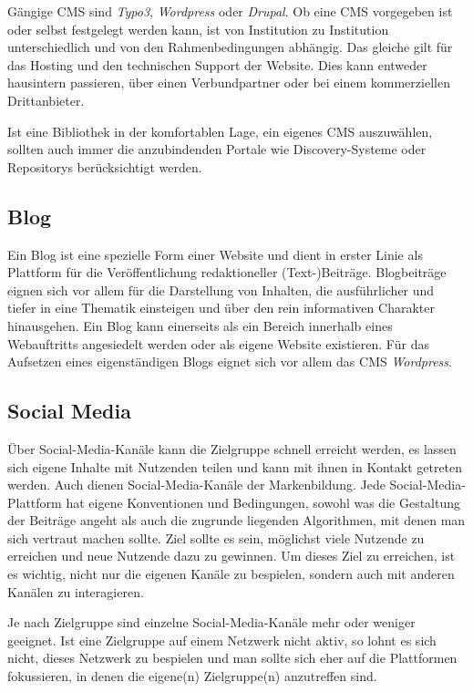 \documentclass[
  11pt,
  letterpaper,
  DIV=11,
  twoside]{scrreprt}
\begin{document}
Gängige CMS sind \emph{Typo3}, \emph{Wordpress} oder \emph{Drupal}. Ob
eine CMS vorgegeben ist oder selbst festgelegt werden kann, ist von
Institution zu Institution unterschiedlich und von den Rahmenbedingungen
abhängig. Das gleiche gilt für das Hosting und den technischen Support
der Website. Dies kann entweder hausintern passieren, über einen
Verbundpartner oder bei einem kommerziellen Drittanbieter.

Ist eine Bibliothek in der komfortablen Lage, ein eigenes CMS
auszuwählen, sollten auch immer die anzubindenden Portale wie
Discovery-Systeme oder Repositorys berücksichtigt werden.

\subsection{Blog}\label{blog}

Ein Blog ist eine spezielle Form einer Website und dient in erster Linie
als Plattform für die Veröffentlichung redaktioneller (Text-)Beiträge.
Blogbeiträge eignen sich vor allem für die Darstellung von Inhalten, die
ausführlicher und tiefer in eine Thematik einsteigen und über den rein
informativen Charakter hinausgehen. Ein Blog kann einerseits als ein
Bereich innerhalb eines Webauftritts angesiedelt werden oder als eigene
Website existieren. Für das Aufsetzen eines eigenständigen Blogs eignet
sich vor allem das CMS \emph{Wordpress}.

\subsection{Social Media}\label{social-media}

Über Social-Media-Kanäle kann die Zielgruppe schnell erreicht werden, es
lassen sich eigene Inhalte mit Nutzenden teilen und kann mit ihnen in
Kontakt getreten werden. Auch dienen Social-Media-Kanäle der
Markenbildung. Jede Social-Media-Plattform hat eigene Konventionen und
Bedingungen, sowohl was die Gestaltung der Beiträge angeht als auch die
zugrunde liegenden Algorithmen, mit denen man sich vertraut machen
sollte. Ziel sollte es sein, möglichst viele Nutzende zu erreichen und
neue Nutzende dazu zu gewinnen. Um dieses Ziel zu erreichen, ist es
wichtig, nicht nur die eigenen Kanäle zu bespielen, sondern auch mit
anderen Kanälen zu interagieren.

Je nach Zielgruppe sind einzelne Social-Media-Kanäle mehr oder weniger
geeignet. Ist eine Zielgruppe auf einem Netzwerk nicht aktiv, so lohnt
es sich nicht, dieses Netzwerk zu bespielen und man sollte sich eher auf
die Plattformen fokussieren, in denen die eigene(n) Zielgruppe(n)
anzutreffen sind.
\end{document}

